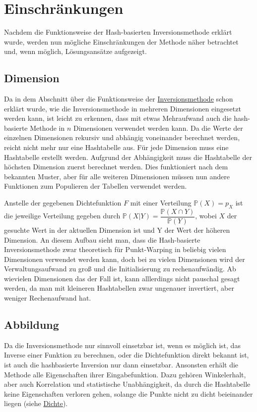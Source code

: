 \section{Einschränkungen}
Nachdem die Funktionsweise der Hash-basierten Inversionsmethode erklärt wurde, 
werden nun mögliche Einschränkungen der Methode näher betrachtet und, wenn möglich, 
Lösungsansätze  aufgezeigt.


\subsection{Dimension}
Da in dem Abschnitt über die Funktionsweise der \hyperref[funktion]{Inversionsmethode} 
schon erklärt wurde, wie die Inversionsmethode in mehreren Dimensionen eingesetzt werden kann, 
ist leicht zu erkennen, dass mit etwas Mehraufwand auch die hash-basierte Methode in $n$ 
Dimensionen verwendet werden kann. Da die Werte der einzelnen Dimensionen rekursiv und 
abhängig voneinander berechnet werden, reicht nicht mehr nur eine Hashtabelle aus. Für 
jede Dimension muss eine Hashtabelle erstellt werden. Aufgrund der Abhängigkeit muss die 
Hashtabelle der höchsten Dimension zuerst berechnet werden. Dies funktioniert nach dem 
bekannten Muster, aber für alle weiteren Dimensionen müssen nun andere Funktionen zum 
Populieren der Tabellen verwendet werden. 

Anstelle der gegebenen Dichtefunktion $F$ mit einer Verteilung $\mathbb{P}(X) = p_X$ ist die 
jeweilige Verteilung gegeben durch $\mathbb{P}(X|Y)=\dfrac{\mathbb{P}(X\cap Y)}{\mathbb{P}(Y)}$, 
wobei $X$ der gesuchte Wert in der aktuellen Dimension ist und Y der Wert der höheren Dimension. 
An diesem Aufbau sieht man, dass die Hash-basierte Inversionsmethode zwar theoretisch für 
Punkt-Warping in beliebig vielen Dimensionen verwendet werden kann, doch bei zu vielen Dimensionen 
wird der Verwaltungsaufwand zu groß und die Initialisierung zu rechenaufwändig. Ab wievielen 
Dimensionen das der Fall ist, kann alllerdings nicht pauschal gesagt werden, da man mit kleineren 
Hashtabellen zwar ungenauer invertiert, aber weniger Rechenaufwand hat. 


\subsection{Abbildung}
Da die Inversionsmethode nur sinnvoll einsetzbar ist, wenn es möglich ist, das Inverse einer 
Funktion zu berechnen, oder die Dichtefunktion direkt bekannt ist, ist auch die hashbasierte 
Inversion nur dann einsetzbar. Ansonsten erhält die Methode alle Eigenschaften ihrer 
Eingabefunktion. Dazu gehören Winkelerhalt, aber auch Korrelation und statistische 
Unabhängigkeit, da durch die Hashtabelle keine Eigenschaften verloren gehen, solange 
die Punkte nicht zu dicht beieinander liegen (siehe \hyperref[Dichte]{Dichte}).


